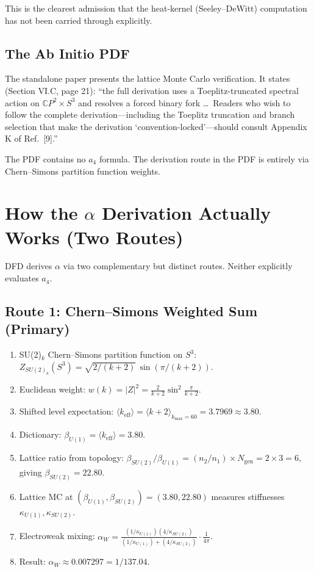 \documentclass[11pt,a4paper]{article}
\begin{document}
This is the clearest admission that the heat-kernel (Seeley--DeWitt) computation
has not been carried through explicitly.

\subsection{The Ab Initio PDF}

The standalone paper presents the lattice Monte Carlo verification.  It states
(Section VI.C, page 21): ``the full derivation uses a Toeplitz-truncated
spectral action on $\mathbb{C}P^2 \times S^3$ and resolves a forced binary fork
\ldots\ Readers who wish to follow the complete derivation---including the
Toeplitz truncation and branch selection that make the derivation
`convention-locked'---should consult Appendix K of Ref.~[9].''

The PDF contains no $a_4$ formula.  The derivation route in the PDF is entirely
via Chern--Simons partition function weights.

\section{How the $\alpha$ Derivation Actually Works (Two Routes)}

DFD derives $\alpha$ via two complementary but distinct routes.  Neither
explicitly evaluates $a_4$.

\subsection{Route 1: Chern--Simons Weighted Sum (Primary)}

\begin{enumerate}
\item SU(2)$_k$ Chern--Simons partition function on $S^3$:
$Z_{SU(2)_k}(S^3) = \sqrt{2/(k+2)}\,\sin(\pi/(k+2))$.
\item Euclidean weight: $w(k) = |Z|^2 = \frac{2}{k+2}\sin^2\!\frac{\pi}{k+2}$.
\item Shifted level expectation:
$\langle k_{\mathrm{eff}} \rangle = \langle k+2 \rangle_{k_{\max}=60} = 3.7969 \approx 3.80$.
\item Dictionary: $\beta_{U(1)} = \langle k_{\mathrm{eff}} \rangle = 3.80$.
\item Lattice ratio from topology: $\beta_{SU(2)}/\beta_{U(1)} = (n_2/n_1) \times N_{\mathrm{gen}} = 2 \times 3 = 6$, giving $\beta_{SU(2)} = 22.80$.
\item Lattice MC at $(\beta_{U(1)}, \beta_{SU(2)}) = (3.80, 22.80)$ measures
stiffnesses $\kappa_{U(1)}, \kappa_{SU(2)}$.
\item Electroweak mixing:
$\alpha_W = \frac{(1/\kappa_{U(1)})(4/\kappa_{SU(2)})}{(1/\kappa_{U(1)}) + (4/\kappa_{SU(2)})} \cdot \frac{1}{4\pi}$.
\item Result: $\alpha_W \approx 0.007297 = 1/137.04$.
\end{enumerate}
\end{document}

